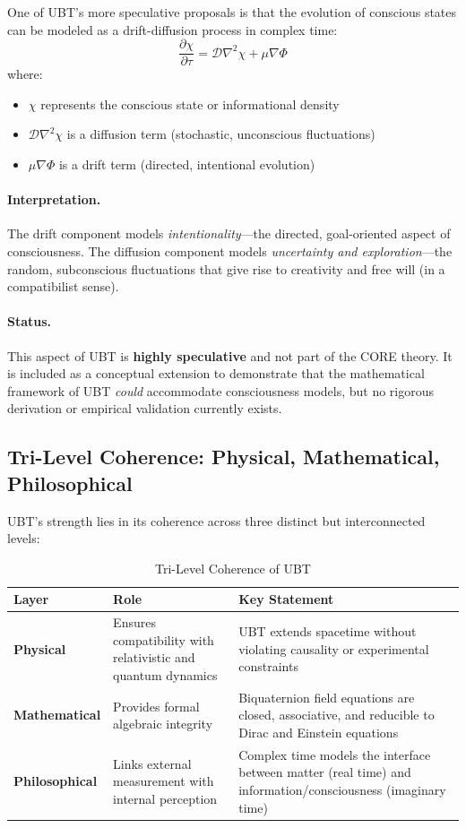 One of UBT's more speculative proposals is that the evolution of conscious states can be modeled as a drift-diffusion process in complex time:
\begin{equation}
\frac{\partial \chi}{\partial \tau} = \mathcal{D}\nabla^2 \chi + \mu \nabla \Phi
\end{equation}
where:
\begin{itemize}
\item $\chi$ represents the conscious state or informational density
\item $\mathcal{D}\nabla^2\chi$ is a diffusion term (stochastic, unconscious fluctuations)
\item $\mu\nabla\Phi$ is a drift term (directed, intentional evolution)
\end{itemize}

\paragraph{Interpretation.} The drift component models \emph{intentionality}—the directed, goal-oriented aspect of consciousness. The diffusion component models \emph{uncertainty and exploration}—the random, subconscious fluctuations that give rise to creativity and free will (in a compatibilist sense).

\paragraph{Status.} This aspect of UBT is \textbf{highly speculative} and not part of the CORE theory. It is included as a conceptual extension to demonstrate that the mathematical framework of UBT \emph{could} accommodate consciousness models, but no rigorous derivation or empirical validation currently exists.

\subsection{Tri-Level Coherence: Physical, Mathematical, Philosophical}

UBT's strength lies in its coherence across three distinct but interconnected levels:

\begin{table}[h]
\centering
\caption{Tri-Level Coherence of UBT}
\label{tab:trilevel}
\begin{tabular}{|p{2.5cm}|p{5cm}|p{5.5cm}|}
\hline
\textbf{Layer} & \textbf{Role} & \textbf{Key Statement} \\ \hline
\textbf{Physical} & Ensures compatibility with relativistic and quantum dynamics & UBT extends spacetime without violating causality or experimental constraints \\ \hline
\textbf{Mathematical} & Provides formal algebraic integrity & Biquaternion field equations are closed, associative, and reducible to Dirac and Einstein equations \\ \hline
\textbf{Philosophical} & Links external measurement with internal perception & Complex time models the interface between matter (real time) and information/consciousness (imaginary time) \\ \hline
\end{tabular}
\end{table}

